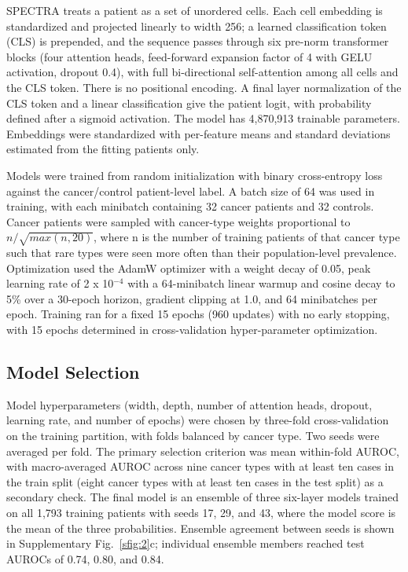 \documentclass[11pt]{article}
\begin{document}
SPECTRA treats a patient as a set of unordered cells. Each cell embedding is standardized and projected linearly to width 256; a learned classification token (CLS) is prepended, and the sequence passes through six pre-norm transformer blocks\cite{xiong2020} (four attention heads, feed-forward expansion factor of 4 with GELU activation\cite{hendrycks2016}, dropout 0.4), with full bi-directional self-attention among all cells and the CLS token. There is no positional encoding. A final layer normalization of the CLS token and a linear classification give the patient logit, with probability defined after a sigmoid activation. The model has 4,870,913 trainable parameters. Embeddings were standardized with per-feature means and standard deviations estimated from the fitting patients only.

Models were trained from random initialization with binary cross-entropy loss against the cancer/control patient-level label. A batch size of 64 was used in training, with each minibatch containing 32 cancer patients and 32 controls. Cancer patients were sampled with cancer-type weights proportional to $n/\sqrt{max(n, 20)}$, where n is the number of training patients of that cancer type such that rare types were seen more often than their population-level prevalence. Optimization used the AdamW optimizer\cite{loshchilov2019} with a weight decay of 0.05, peak learning rate of 2 x 10$^{-4}$ with a 64-minibatch linear warmup and cosine decay\cite{loshchilov2017} to 5\% over a 30-epoch horizon, gradient clipping at 1.0, and 64 minibatches per epoch. Training ran for a fixed 15 epochs (960 updates) with no early stopping, with 15 epochs determined in cross-validation hyper-parameter optimization.

\subsection*{Model Selection}

Model hyperparameters (width, depth, number of attention heads, dropout, learning rate, and number of epochs) were chosen by three-fold cross-validation on the training partition, with folds balanced by cancer type. Two seeds were averaged per fold. The primary selection criterion was mean within-fold AUROC, with macro-averaged AUROC across nine cancer types with at least ten cases in the train split (eight cancer types with at least ten cases in the test split) as a secondary check. The final model is an ensemble of three six-layer models trained on all 1,793 training patients with seeds 17, 29, and 43, where the model score is the mean of the three probabilities. Ensemble agreement between seeds is shown in Supplementary Fig.~\ref{sfig:2}c; individual ensemble members reached test AUROCs of 0.74, 0.80, and 0.84.
\end{document}
